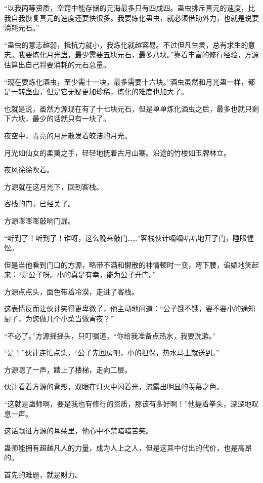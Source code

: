 
\begin{this_body}

“以我丙等资质，空窍中能存储的元海最多只有四成四。蛊虫排斥真元的速度，比我自我恢复真元的速度还要快很多。我要炼化蛊虫，就必须借助外力，也就是说要消耗元石。”

“蛊虫的意志越弱，抵抗力就小，我炼化就越容易。不过但凡生灵，总有求生的意志。我要炼化月光蛊，最少需要五块元石，最多八块。”靠着丰富的修行经验，方源估算出自己将要消耗的元石总量。

“现在要炼化酒虫，至少需十一块，最多需要十六块。”酒虫虽然和月光蛊一样，都是一转蛊虫，但是它无疑更加珍稀，炼化的难度也加大了。

也就是说，虽然方源现在有了十七块元石，但是单单炼化酒虫之后，最多也就只剩下六块，最少的话就只有一块了。

夜空中，青亮的月牙散发着皎洁的月光。

月光如仙女的柔荑之手，轻轻地抚着古月山寨。沿途的竹楼如玉牌林立。

夜风徐徐吹着。

方源就在这月光下，回到客栈。

客栈的门，已经关了。

方源嘭嘭嘭敲响门扉。

“听到了！听到了！谁呀，这么晚来敲门……”客栈伙计嘀嘀咕咕地开了门，睡眼惺忪。

但是当他看到门口的方源，略带不满和懒散的神情顿时一变，弯下腰，谄媚地笑起来：“是公子呀。小的真是有幸，能为公子开门。”

方源点点头，面色带着冷漠，走进了客栈。

这表情反而让伙计笑得更卑微了，他主动地问道：“公子饿不饿，要不要小的通知厨子，为您做几个小菜当做宵夜？”

“不必了。”方源摇摇头，只叮嘱道，“你给我准备点热水，我要洗漱。”

“是！”伙计连忙点头，“公子先回房吧，小的担保，热水马上就送到。”

方源嗯了一声，踏上了楼梯，走向二层。

伙计看着方源的背影，双眼在灯火中闪着光，流露出明显的羡慕之色。

“这就是蛊师啊，要是我也有修行的资质，那该有多好啊！”他握着拳头，深深地叹息一声。

这话飘进方源的耳朵里，他心中不禁暗暗苦笑。

蛊师能拥有超越凡人的力量，成为人上之人，但是这其中付出的代价，也是高昂的。

首先的难题，就是财力。


\end{this_body}
